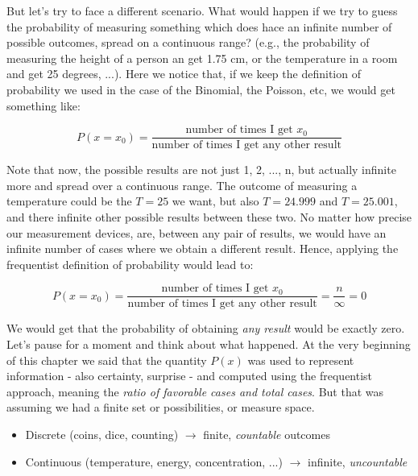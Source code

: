 \documentclass{book}
\begin{document}
But let's try to face a different scenario. What would happen if we try to guess the probability of measuring something which does hace an infinite number of possible outcomes, spread on a continuous range? (e.g., the probability of measuring the height of a person an get 1.75 cm, or the temperature in a room and get 25 degrees, ...). Here we notice that, if we keep the definition of probability we used in the case of the Binomial, the Poisson, etc, we would get something like:

\begin{equation}
P(x = x_{0}) = \frac{\text{number of times I get $x_{0}$}}{\text{number of times I get any other result}}
\end{equation}

Note that now, the possible results are not just 1, 2, ..., n, but actually infinite more and spread over a continuous range. The outcome of measuring a temperature could be the $T = 25$ we want, but also $T = 24.999$ and $T = 25.001$, and there infinite other possible results between these two. No matter how precise our measurement devices, are, between any pair of results, we would have an infinite number of cases where we obtain a different result. Hence, applying the frequentist definition of probability would lead to:

\begin{equation}
P(x = x_{0}) = \frac{\text{number of times I get $x_{0}$}}{\text{number of times I get any other result}} = \frac{n}{\infty} = 0
\end{equation}

We would get that the probability of obtaining \textit{any result} would be exactly zero.\\

Let's pause for a moment and think about what happened. At the very beginning of this chapter we said that the quantity $P(x)$ was used to represent information - also certainty, surprise - and computed using the frequentist approach, meaning the \textit{ratio of favorable cases and total cases}. But that was assuming we had a finite set or possibilities, or measure space.

\begin{itemize}
\item Discrete (coins, dice, counting) $\longrightarrow$ finite, \textit{countable} outcomes
\item Continuous (temperature, energy, concentration, ...) $\longrightarrow$ infinite, \textit{uncountable}
\end{itemize}
\end{document}
